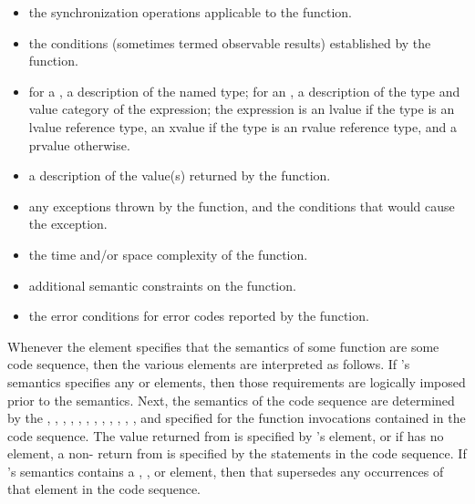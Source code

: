 \begin{itemize}
\item
\sync
the synchronization operations applicable to the function.

\item
\ensures
the conditions (sometimes termed observable results)
established by the function.

\item
\result
for a , a description of the named type;
for an ,
a description of the type and value category of the expression;
the expression is an lvalue if the type is an lvalue reference type,
an xvalue if the type is an rvalue reference type, and
a prvalue otherwise.

\item
\returns
a description of the value(s) returned by the function.

\item
\throws
any exceptions thrown by the function, and the conditions that would cause the exception.

\item
\complexity
the time and/or space complexity of the function.

\item
\remarks
additional semantic constraints on the function.

\item
\errors
the error conditions for error codes reported by the function.
\end{itemize}

\pnum
Whenever the  element specifies that the semantics of some function
 are  some code sequence, then the various elements are
interpreted as follows.
If 's semantics specifies any  or  elements,
then those requirements are logically imposed prior to the  semantics.
Next, the semantics of the code sequence are determined by the
,
,
,
,
,
,
,
,
,
,
,
, and
specified for the function invocations contained in the code sequence.
The value returned from  is specified by 's  element,
or if  has no  element,
a non- return from  is specified by the
 statements in the code sequence.
If 's semantics contains a ,
, or  element,
then that supersedes any occurrences of that element in the code sequence.

